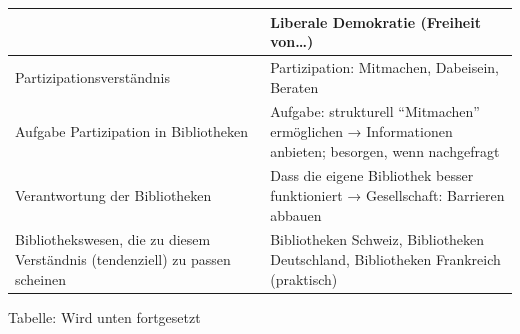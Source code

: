 \documentclass[a4paper,
fontsize=11pt,
oneside,
numbers=noperiodatend,
parskip=half-,
bibliography=totoc,
final
]{scrartcl}
\begin{document}
\begin{longtable}[]{@{}ll@{}}
\toprule
\begin{minipage}[b]{0.41\columnwidth}\raggedright
\strut
\end{minipage} & \begin{minipage}[b]{0.41\columnwidth}\raggedright
Liberale Demokratie (Freiheit von\ldots{})\strut
\end{minipage}\tabularnewline
\midrule
\endhead
\begin{minipage}[t]{0.41\columnwidth}\raggedright
Partizipationsverständnis\strut
\end{minipage} & \begin{minipage}[t]{0.41\columnwidth}\raggedright
Partizipation: Mitmachen, Dabeisein, Beraten\strut
\end{minipage}\tabularnewline
\begin{minipage}[t]{0.41\columnwidth}\raggedright
Aufgabe Partizipation in Bibliotheken\strut
\end{minipage} & \begin{minipage}[t]{0.41\columnwidth}\raggedright
Aufgabe: strukturell \enquote{Mitmachen} ermöglichen → Informationen
anbieten; besorgen, wenn nachgefragt\strut
\end{minipage}\tabularnewline
\begin{minipage}[t]{0.41\columnwidth}\raggedright
Verantwortung der Bibliotheken\strut
\end{minipage} & \begin{minipage}[t]{0.41\columnwidth}\raggedright
Dass die eigene Bibliothek besser funktioniert → Gesellschaft: Barrieren
abbauen\strut
\end{minipage}\tabularnewline
\begin{minipage}[t]{0.41\columnwidth}\raggedright
Bibliothekswesen, die zu diesem Verständnis (tendenziell) zu passen
scheinen\strut
\end{minipage} & \begin{minipage}[t]{0.41\columnwidth}\raggedright
Bibliotheken Schweiz, Bibliotheken Deutschland, Bibliotheken Frankreich
(praktisch)\strut
\end{minipage}\tabularnewline
\bottomrule
\end{longtable}

Tabelle: Wird unten fortgesetzt
\end{document}
